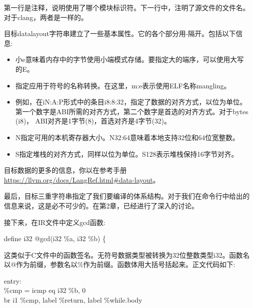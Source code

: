 第一行是注释，说明使用了哪个模块标识符。下一行中，注明了源文件的文件名。对于clang，两者是一样的。\par

目标datalayout字符串建立了一些基本属性。它的各个部分用-隔开。包括以下信息:\par

\begin{itemize}
	\item 小e意味着内存中的字节使用小端模式存储。要指定大的端序，可以使用大写的E。
	\item 指定应用于符号的名称转换。在这里，m:e表示使用ELF名称mangling。
	\item 例如，在iN:A:P形式中的条目i8:8:32，指定了数据的对齐方式，以位为单位。第一个数字是ABI所需的对齐方式，第二个数字是首选的对齐方式。对于bytes (i8)， ABI对齐是1字节(8)，首选对齐是4字节(32)。
	\item N指定可用的本机寄存器大小。N32:64意味着本地支持32位和64位宽整数。
	\item S指定堆栈的对齐方式，同样以位为单位。S128表示堆栈保持16字节对齐。
\end{itemize}

\begin{tcolorbox}[colback=blue!5!white,colframe=blue!75!black,title=Note]
目标数据的更多的信息，你以在参考手册\url{https://llvm.org/docs/LangRef.html#data-layout}。
\end{tcolorbox}

最后，目标三重字符串指定了我们要编译的体系结构。对于我们在命令行中给出的信息来说，这是必不可少的。在第2章，已经进行了深入的讨论。\par

接下来，在IR文件中定义gcd函数:\par

\begin{tcolorbox}[colback=white,colframe=black]
define i32 @gcd(i32 \%a, i32 \%b) \{
\end{tcolorbox}

这类似于C文件中的函数签名。无符号数据类型被转换为32位整数类型i32。函数名以@作为前缀，参数名以\%作为前缀。函数体用大括号括起来。正文代码如下:\par

\begin{tcolorbox}[colback=white,colframe=black]
entry: \\
\hspace*{0.5cm}\%cmp = icmp eq i32 \%b, 0 \\
\hspace*{0.5cm}br i1 \%cmp, label \%return, label \%while.body
\end{tcolorbox}

